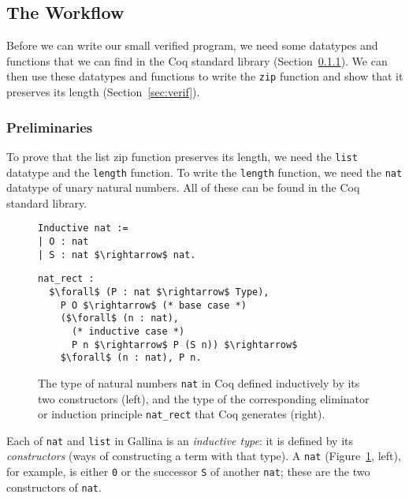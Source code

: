 \subsection{The Workflow}
\label{sec:mot-workflow}

Before we can write our small verified program, we need some datatypes and functions that we can find in the Coq standard library (Section~\ref{sec:prelims}).
We can then use these datatypes and functions to write the \lstinline{zip} function and show that it preserves its length (Section~\ref{sec:verif}).

\subsubsection{Preliminaries}
\label{sec:prelims}

To prove that the list zip function preserves its length,
we need the \lstinline{list} datatype and the \lstinline{length} function.
To write the \lstinline{length} function, we need the \lstinline{nat} datatype of unary natural numbers.
All of these can be found in the Coq standard library.

\begin{figure}
\begin{minipage}{0.30\textwidth}
\begin{lstlisting}
Inductive nat :=
| O : nat
| S : nat $\rightarrow$ nat.
\end{lstlisting}
\end{minipage}
\hfill
\begin{minipage}{0.68\textwidth}
\begin{lstlisting}
nat_rect :
  $\forall$ (P : nat $\rightarrow$ Type),
    P O $\rightarrow$ (* base case *)
    ($\forall$ (n : nat),
      (* inductive case *)
      P n $\rightarrow$ P (S n)) $\rightarrow$
    $\forall$ (n : nat), P n.
\end{lstlisting}
\end{minipage}
\caption{The type of natural numbers \lstinline{nat} in Coq defined inductively by its two constructors (left), and the type of the corresponding eliminator or induction principle \lstinline{nat_rect} that Coq generates (right).}
\label{fig:nat}
\end{figure}

Each of \lstinline{nat} and \lstinline{list} in Gallina is an \textit{inductive type}:
it is defined by its \textit{constructors} (ways of constructing a term with that type).
A \lstinline{nat} (Figure~\ref{fig:nat}, left), for example,
is either \lstinline{0} or the successor \lstinline{S} of another \lstinline{nat};
these are the two constructors of \lstinline{nat}.

